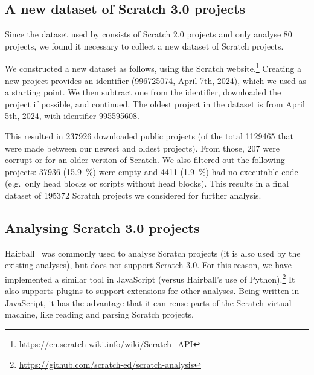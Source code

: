 \documentclass[../main]{subfiles}
\begin{document}
\subsection{A new dataset of Scratch 3.0 projects}\label{subsec:a-new-dataset-of-scratch-projects}

Since the dataset used by \textcite{aivaloglouHowKidsCode2016} consists of Scratch 2.0 projects and \textcite{fronzaApproachEvaluateComplexity2020} only analyse 80 projects, we found it necessary to collect a new dataset of Scratch projects.

We constructed a new dataset as follows, using the Scratch website.\footnote{\url{https://en.scratch-wiki.info/wiki/Scratch_API}}
Creating a new project provides an identifier ({996725074}, April 7th, 2024), which we used as a starting point.
We then subtract one from the identifier, downloaded the project if possible, and continued.
The oldest project in the dataset is from April 5th, 2024, with identifier {995595608}.

This resulted in \num{237926} downloaded public projects (of the total \num{1129465} that were made between our newest and oldest projects).
From those, \num{207} were corrupt or for an older version of Scratch.
We also filtered out the following projects: \num{37936} (\qty{15.9}{\percent}) were empty and \num{4411} (\qty{1.9}{\percent}) had no executable code (e.g.\ only head blocks or scripts without head blocks).
This results in a final dataset of \num{195372} Scratch projects we considered for further analysis.

\subsection{Analysing Scratch 3.0 projects}\label{subsec:analysing-scratch-3.0-projects}

Hairball~\autocite{boeHairballLintinspiredStatic2013} was commonly used to analyse Scratch projects (it is also used by the existing analyses), but does not support Scratch 3.0.
For this reason, we have implemented a similar tool in JavaScript (versus Hairball's use of Python).\footnote{\url{https://github.com/scratch-ed/scratch-analysis}}
It also supports plugins to support extensions for other analyses.
Being written in JavaScript, it has the advantage that it can reuse parts of the Scratch virtual machine, like reading and parsing Scratch projects.
\end{document}

